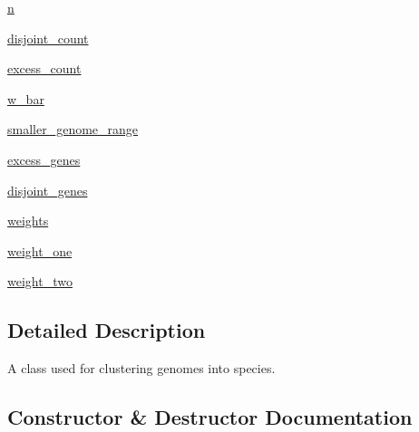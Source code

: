 \begin{DoxyCompactItemize}
\item 
\hyperlink{classNEAT__PyGenetics_1_1NEAT_1_1Analyst_1_1GenomeClusterer_1_1GenomeClusterer_aed8ff1fe75594eae5a5422965cca13b5}{n}
\item 
\hyperlink{classNEAT__PyGenetics_1_1NEAT_1_1Analyst_1_1GenomeClusterer_1_1GenomeClusterer_abc33fd75cd1bbcb72c3bfea41db56b63}{disjoint\+\_\+count}
\item 
\hyperlink{classNEAT__PyGenetics_1_1NEAT_1_1Analyst_1_1GenomeClusterer_1_1GenomeClusterer_a0e1ff1aa859082568b6b5efeeb029234}{excess\+\_\+count}
\item 
\hyperlink{classNEAT__PyGenetics_1_1NEAT_1_1Analyst_1_1GenomeClusterer_1_1GenomeClusterer_adf2a23e3ff4eca53b7b4834cd9b51275}{w\+\_\+bar}
\item 
\hyperlink{classNEAT__PyGenetics_1_1NEAT_1_1Analyst_1_1GenomeClusterer_1_1GenomeClusterer_a402e6e20884053cc0ae8f04f86734091}{smaller\+\_\+genome\+\_\+range}
\item 
\hyperlink{classNEAT__PyGenetics_1_1NEAT_1_1Analyst_1_1GenomeClusterer_1_1GenomeClusterer_a4fdea1cdff3d733af9de249641892695}{excess\+\_\+genes}
\item 
\hyperlink{classNEAT__PyGenetics_1_1NEAT_1_1Analyst_1_1GenomeClusterer_1_1GenomeClusterer_a1aed67ecb6dba5bad3cf73de3b756b91}{disjoint\+\_\+genes}
\item 
\hyperlink{classNEAT__PyGenetics_1_1NEAT_1_1Analyst_1_1GenomeClusterer_1_1GenomeClusterer_aff7fba61d7cd8eeeed9149ed48211699}{weights}
\item 
\hyperlink{classNEAT__PyGenetics_1_1NEAT_1_1Analyst_1_1GenomeClusterer_1_1GenomeClusterer_ac1f8f1740d1a6663cc8fb29fe29f3c35}{weight\+\_\+one}
\item 
\hyperlink{classNEAT__PyGenetics_1_1NEAT_1_1Analyst_1_1GenomeClusterer_1_1GenomeClusterer_a2541d20300efb0cff96a18abb6a85d81}{weight\+\_\+two}
\end{DoxyCompactItemize}


\subsection{Detailed Description}
A class used for clustering genomes into species. 

\subsection{Constructor \& Destructor Documentation}
